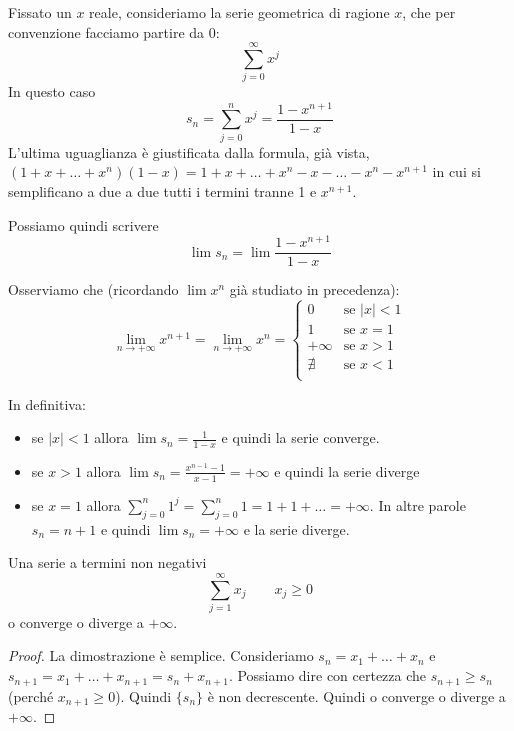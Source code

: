\begin{example}
Fissato un $x$ reale, consideriamo la serie geometrica di ragione $x$, che per convenzione facciamo partire da 0:
\begin{equation*}
\sum_{j=0}^\infty x^j
\end{equation*}
In questo caso
\begin{equation*}
s_n = \sum_{j=0}^n x^j = \frac{1-x^{n+1}}{1-x}
\end{equation*}
L'ultima uguaglianza è giustificata dalla formula, già vista, $(1+x+\ldots+x^n)(1-x) = 1 + x + \ldots + x^n - x - \ldots - x^n - x^{n+1}$ in cui si semplificano a due a due tutti i termini tranne 1 e $x^{n+1}$.
\end{example}
Possiamo quindi scrivere
\begin{equation*}
\lim s_n = \lim \frac{1-x^{n+1}}{1-x}
\end{equation*}

Osserviamo che (ricordando $\lim x^n$ già studiato in precedenza):
\begin{equation*}
\lim_{n \to +\infty}x^{n+1} = \lim_{n \to +\infty}x^n = 
\begin{cases}
0 & \mbox{se } |x| < 1 \\
1 & \mbox{se } x = 1 \\
+\infty & \mbox{se } x > 1 \\
\nexists & \mbox{se } x < 1 \\
\end{cases}
\end{equation*}

In definitiva:
\begin{itemize}
\item se $|x| < 1$ allora $\lim s_n = \frac{1}{1-x}$ e quindi la serie converge.
\item se $x > 1$ allora $\lim s_n = \frac{x^{n-1}-1}{x-1} = +\infty$ e quindi la serie diverge
\item se $x = 1$ allora $\sum_{j=0}^n 1^j = \sum_{j=0}^n 1 = 1 + 1 + \ldots = +\infty$. In altre parole $s_n=n+1$ e quindi $\lim s_n = +\infty$ e la serie diverge.
\end{itemize}

\begin{proposition}
Una serie a termini non negativi
\begin{equation*}
\sum_{j=1}^\infty x_j \qquad x_j \ge 0
\end{equation*}
o converge o diverge a $+\infty$.
\end{proposition}
\begin{proof}
La dimostrazione è semplice. Consideriamo $s_n = x_1 + \ldots + x_n$ e $s_{n+1} = x_1 + \ldots + x_{n+1} = s_n + x_{n+1}$. Possiamo dire con certezza che $s_{n+1} \ge s_n$ (perché $x_{n+1} \ge 0$). Quindi $\{s_n\}$  è non decrescente. Quindi o converge o diverge a $+\infty$.
\end{proof}

